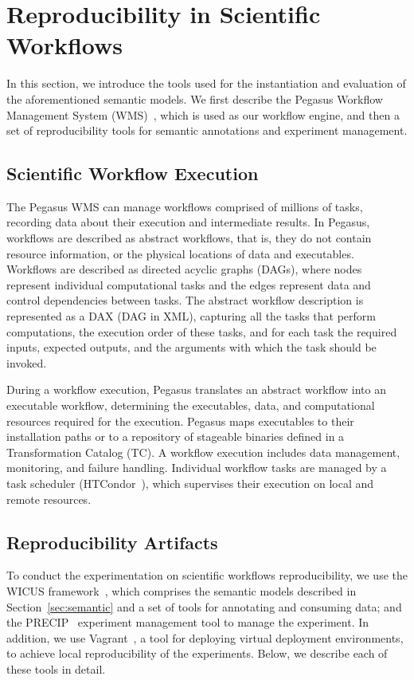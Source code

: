 \section{Reproducibility in Scientific Workflows}
\label{sec:reproducibility}

In this section, we introduce the tools used for the instantiation and evaluation 
of the aforementioned semantic models. We first describe the Pegasus Workflow 
Management System (WMS)~\cite{Deelman-FGCS-2014}, which is used as our 
workflow engine, and then a set of reproducibility tools for semantic annotations and 
experiment management.


\subsection{Scientific Workflow Execution}

The Pegasus WMS can manage workflows comprised of millions of tasks, recording data 
about their execution and intermediate results. In Pegasus, workflows are described as 
abstract workflows, that is, they do not contain resource information, or the physical locations of 
data and executables. Workflows are described as directed acyclic graphs (DAGs), where 
nodes represent individual computational tasks and the edges represent data and control 
dependencies between tasks. The abstract workflow description is represented as a DAX 
(DAG in XML), capturing all the tasks that perform computations, the execution order of these 
tasks, and for each task the required inputs, expected outputs, and the arguments with which 
the task should be invoked. 

During a workflow execution, Pegasus translates an abstract workflow into an 
executable workflow, determining the executables, data, and computational resources 
required for the execution. Pegasus maps executables to their installation paths or to a 
repository of stageable binaries defined in a Transformation Catalog (TC). A workflow 
execution includes data management, monitoring, and failure handling. Individual workflow 
tasks are managed by a task scheduler (HTCondor~\cite{condor}), which supervises their 
execution on local and remote resources.


\subsection{Reproducibility Artifacts}

To conduct the experimentation on scientific workflows reproducibility, we 
use the WICUS framework~\cite{wicus}, which comprises the semantic models described 
in Section~\ref{sec:semantic} and a set of tools for annotating and consuming data; and 
the PRECIP~\cite{Azarnoosh-CRC-2013} experiment management tool to manage the 
experiment. In addition, we use Vagrant~\cite{palat2012introducing}, a tool for deploying virtual
deployment environments,  to achieve local reproducibility of the experiments. 
Below, we describe each of these tools in detail.


